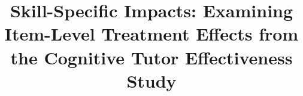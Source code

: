 \documentclass{edm_template}
\begin{document}
\title{Skill-Specific Impacts: Examining Item-Level Treatment Effects
  from the Cognitive Tutor Effectiveness Study}
%
%
%
%
%
\end{document}

